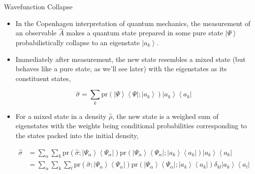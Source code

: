 \documentclass[9pt,handout]{beamer}
\newcommand{\pr}[0]{\text{pr}}
\begin{document}
\begin{frame}{Wavefunction Collapse}
\begin{itemize}
\item In the Copenhagen interpretation of quantum mechanics, the measurement of an observable $\widehat{A}$ makes a quantum state prepared in some pure state $\left\lvert \Psi \right\rangle$ probabilistically collapse to an eigenstate $\left\lvert a_k \right\rangle$.

\item Immediately after measurement, the new state resembles a mixed state (but behaves like a pure state, as we'll see later) with the eigenstates as its constituent states,

$$\widehat{\sigma} = \sum_k \pr \left( \left\lvert \Psi \right\rangle \left\langle \Psi \right\rvert; \left\lvert a_k \right\rangle \right) \left\lvert a_k \right\rangle \left\langle a_k \right\rvert$$

\item For a mixed state in a density $\widehat{\rho}$, the new state is a weighed sum of eigenstates with the weights being conditional probabilities corresponding to the states packed into the initial density,

\begin{align*}
\widehat{\sigma} & = \sum_\alpha \sum_k \pr \left( \widehat{\sigma}; \left\lvert \Psi_\alpha \right\rangle \left\langle \Psi_\alpha \right\rvert \right) \pr \left( \left\lvert \Psi_\alpha \right\rangle \left\langle \Psi_\alpha \right\rvert; \left\lvert a_k \right\rangle \left\langle a_k \right\rvert \right) \left\lvert a_k \right\rangle \left\langle a_k \right\rvert \\
& = \sum_\alpha \sum_k \sum_l \pr \left( \widehat{\sigma}; \left\lvert \Psi_\alpha \right\rangle \left\langle \Psi_\alpha \right\rvert \right) \pr \left( \left\lvert \Psi_\alpha \right\rangle \left\langle \Psi_\alpha \right\rvert; \left\lvert a_k \right\rangle \left\langle a_k \right\rvert \right) \delta_{k l} \left\lvert a_k \right\rangle \left\langle a_l \right\rvert
\end{align*}
\end{itemize}
\end{frame}
\end{document}
